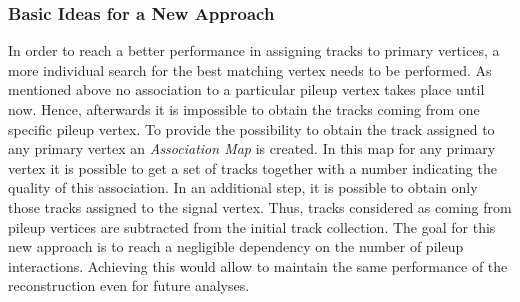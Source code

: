 \subsubsection{Basic Ideas for a New Approach}

In order to reach a better performance in assigning tracks to primary vertices, a more individual search for the best matching vertex needs to be performed. As mentioned above no association to a particular pileup vertex takes place until now. Hence, afterwards it is impossible to obtain the tracks coming from one specific pileup vertex. To provide the possibility to obtain the track assigned to any primary vertex an \textit{Association Map} is created. In this map for any primary vertex it is possible to get a set of tracks together with a number indicating the quality of this association. In an additional step, it is possible to obtain only those tracks assigned to the signal vertex. Thus, tracks considered as coming from pileup vertices are subtracted from the initial track collection. The goal for this new approach is to reach a negligible dependency on the number of pileup interactions. Achieving this would allow to maintain the same performance of the reconstruction even for future analyses.

